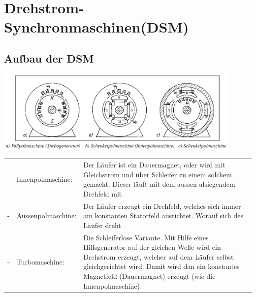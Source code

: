\newcommand{\titleinfo}{Elekrische Maschinen - Formelsammlung}
\newcommand{\authorinfo}{F. Braun, L. Schmid, U. Giger, R. Koller, S.
Arnold, S. Ferreti}
\newcommand{\versioninfo}{$Revision: 975 $ - powered by \LaTeX}

%



 
\newcommand{\abb}[3]{
\begin{center}
\texttt{[image: \#1]} \\
Abbildung \arabic{abbildungen}: #3 
\stepcounter{abbildungen}    
    \end{center}
}










\section{Drehstrom- Synchronmaschinen(DSM)}
	\subsection{Aufbau der DSM}
		\includegraphics[width=12cm]{./images/Aufbau_DSM.png}\\
		\begin{tabular}{ p{1cm} p{4cm} p{10cm}}
			- & Innenpolmaschine: & Der Läufer ist ein Dauermagnet, oder wird mit
			Gleichstrom und über Schleifer zu einem solchem gemacht. Dieser läuft mit dem aussen
			alsiegendem Drehfeld mit\\
			- & Aussenpolmaschine: & Der Läufer erzeugt ein Drehfeld, welches sich immer
			am konstanten Statorfeld ausrichtet. Worauf sich des Läufer dreht\\
			- & Turbomaschine: & Die Schleiferlose Variante. Mit Hilfe eines
			Hilfsgenerator auf der gleichen Welle wird ein Drehstrom erzeugt, welcher
			auf dem Läufer selbst gleichgerichtet wird. Damit wird dan ein konstantes
			Magnetfeld (Dauermagnet) erzeugt (wie die Innenpolmaschine)\\
		\end{tabular}
